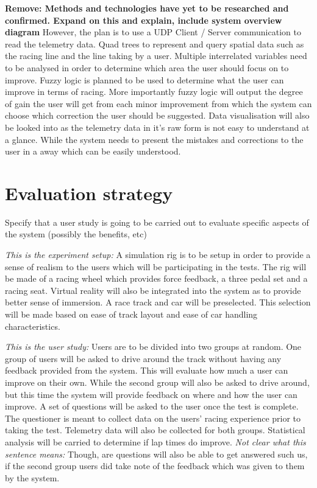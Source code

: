 \documentclass{article}
\begin{document}
\textbf{Remove: Methods and technologies have yet to be researched and confirmed. Expand on this and explain, include system overview diagram}
However, the plan is to use a UDP Client / Server communication to read the telemetry data. Quad trees to represent and query spatial data such as the racing line and the line taking by a user. Multiple interrelated variables need to be analysed in order to determine which area the user should focus on to improve. Fuzzy logic is planned to be used to determine what the user can improve in terms of racing. More importantly fuzzy logic will output the degree of gain the user will get from each minor improvement from which the system can choose which correction the user should be suggested. Data visualisation will also be looked into as the telemetry data in it’s raw form is not easy to understand at a glance. While the system needs to present the mistakes and corrections to the user in a away which can be easily understood. 

\section{Evaluation strategy}
Specify that a user study is going to be carried out to evaluate specific aspects of the system (possibly the benefits, etc)

\emph{This is the experiment setup:}
A simulation rig is to be setup in order to provide a sense of realism to the users which will be participating in the tests. The rig will be made of a racing wheel which provides force feedback, a three pedal set and a racing seat. Virtual reality will also be integrated into the system as to provide better sense of immersion. A race track and car will be preselected. This selection will be made based on ease of track layout and ease of car handling characteristics. 

\emph{This is the user study:}
Users are to be divided into two groups at random. One group of users will be asked to drive around the track without having any feedback provided from the system. This will evaluate how much a user can improve on their own. While the second group will also be asked to drive around, but this time the system will provide feedback on where and how the user can improve. A set of questions will be asked to the user once the test is complete. The questioner is meant to collect data on the users' racing experience prior to taking the test. Telemetry data will also be collected for both groups. Statistical analysis will be carried to determine if lap times do improve. 
\emph{Not clear what this sentence means:}
Though, are questions will also be able to get answered such us, if the second group users did take note of the feedback which was given to them by the system.
\end{document}
